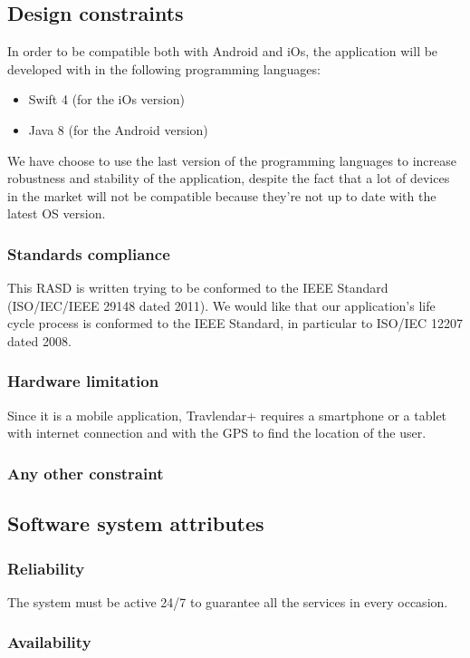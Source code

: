 \documentclass[12pt,titlepage]{article}
\begin{document}
\subsection{Design constraints}\label{sec:mod1}
In order to be compatible both with Android and iOs, the application will be developed with in the following programming languages:
\begin{itemize}
\item Swift 4 (for the iOs version)
\item Java 8 (for the Android version)
\end{itemize}
We have choose to use the last version of the programming languages to increase robustness and stability of the application, despite the fact that a lot of devices in the market will not be compatible because they're not up to date with the latest OS version.

\subsubsection{Standards compliance}\label{sec:mod1}
This RASD is written trying to be conformed to the IEEE Standard (ISO/IEC/IEEE 29148 dated 2011).
We would like that our application's life cycle process is conformed to the IEEE Standard, in particular to ISO/IEC 12207 dated 2008.

\subsubsection{Hardware limitation}\label{sec:mod1}
Since it is a mobile application, Travlendar+ requires a smartphone or a tablet with internet connection and with the GPS to find the location of the user. 

\subsubsection{Any other constraint}\label{sec:mod1}
\subsection{Software system attributes}\label{sec:mod1}
\subsubsection{Reliability}\label{sec:mod1}
The system must be active 24/7 to guarantee all the services in every occasion. 

\subsubsection{Availability}\label{sec:mod1}
\end{document}
